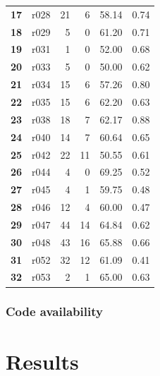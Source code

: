 \documentclass[10pt]{article}
\begin{document}
\begin{tabular}{|l|l|r|r|r|r|}
\textbf{17} &  r028 &  21 &          6 &     58.14 &               0.74 \\
\textbf{18} &  r029 &   5 &          0 &     61.20 &               0.71 \\ 
\textbf{19} &  r031 &   1 &          0 &     52.00 &               0.68 \\ 
\textbf{20} &  r033 &   5 &          0 &     50.00 &               0.62 \\ 
\textbf{21} &  r034 &  15 &          6 &     57.26 &               0.80 \\ 
\textbf{22} &  r035 &  15 &          6 &     62.20 &               0.63 \\ 
\textbf{23} &  r038 &  18 &          7 &     62.17 &               0.88 \\ 
\textbf{24} &  r040 &  14 &          7 &     60.64 &               0.65 \\ 
\textbf{25} &  r042 &  22 &         11 &     50.55 &               0.61 \\ 
\textbf{26} &  r044 &   4 &          0 &     69.25 &               0.52 \\ 
\textbf{27} &  r045 &   4 &          1 &     59.75 &               0.48 \\ 
\textbf{28} &  r046 &  12 &          4 &     60.00 &               0.47 \\ 
\textbf{29} &  r047 &  44 &         14 &     64.84 &               0.62 \\
\textbf{30} &  r048 &  43 &         16 &     65.88 &               0.66 \\ 
\textbf{31} &  r052 &  32 &         12 &     61.09 &               0.41 \\ 
\textbf{32} &  r053 &   2 &          1 &     65.00 &               0.63 \\ 
\hline
\end{tabular}





\subsubsection*{Code availability}

\section{Results}
\end{document}
